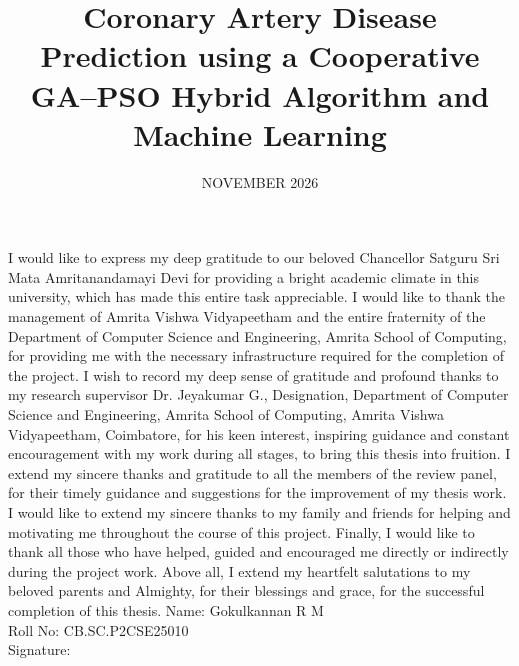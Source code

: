 \documentclass[MTech]{ugthesis}
\begin{document}

\title{Coronary Artery Disease Prediction using a Cooperative GA--PSO Hybrid Algorithm and Machine Learning}
\firstauthorregno{[CB.SC.P2CSE25010]}
\date{NOVEMBER 2026}

\maketitle
\certificate
\acknowledgements
\normalfont
I would like to express my deep gratitude to our beloved Chancellor Satguru Sri Mata Amritanandamayi Devi for providing a bright academic climate in this university, which has made this entire task appreciable. I would like to thank the management of Amrita Vishwa Vidyapeetham and the entire fraternity of the Department of Computer Science and Engineering, Amrita School of Computing, for providing me with the necessary infrastructure required for the completion of the project.
I wish to record my deep sense of gratitude and profound thanks to my research supervisor Dr. Jeyakumar G., Designation, Department of Computer Science and Engineering, Amrita School of Computing, Amrita Vishwa Vidyapeetham, Coimbatore, for his keen interest, inspiring guidance and constant encouragement with my work during all stages, to bring this thesis into fruition.
I extend my sincere thanks and gratitude to all the members of the review panel, for their timely guidance and suggestions for the improvement of my thesis work.
I would like to extend my sincere thanks to my family and friends for helping and motivating me throughout the course of this project.
Finally, I would like to thank all those who have helped, guided and encouraged me directly or indirectly during the project work.
Above all, I extend my heartfelt salutations to my beloved parents and Almighty, for their blessings and grace, for the successful completion of this thesis.
\vskip 25pt
\noindent
Name: Gokulkannan R M\\
Roll No: CB.SC.P2CSE25010\\
Signature:\\
\end{document}
